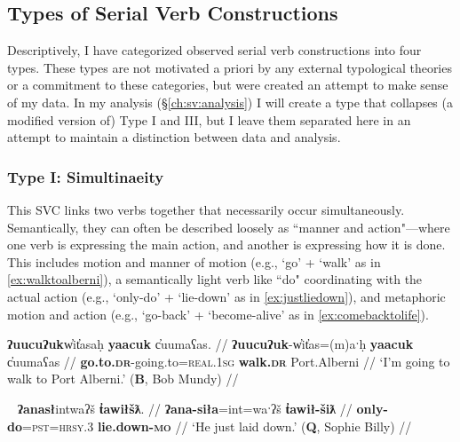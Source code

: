 \subsection{Types of Serial Verb Constructions}

Descriptively, I have categorized observed serial verb constructions into four types. These types are not motivated a priori by any external typological theories or a commitment to these categories, but were created an attempt to make sense of my data. In my analysis (\S\ref{ch:sv:analysis}) I will create a type that collapses (a modified version of) Type I and III, but I leave them separated here in an attempt to maintain a distinction between data and analysis.

\vspace{10pt}

\subsubsection{Type I: Simultinaeity} \label{ch:sv:data:type1}

\vspace{10pt}

This SVC links two verbs together that necessarily occur simultaneously. Semantically, they can often be described loosely as ``manner and action"---where one verb is expressing the main action, and another is expressing how it is done. This includes motion and manner of motion (e.g., `go' + `walk' as in \ref{ex:walktoalberni}), a semantically light verb like ``do" coordinating with the actual action (e.g., `only-do' + `lie-down' as in \ref{ex:justliedown}), and metaphoric motion and action (e.g., `go-back' + `become-alive' as in \ref{ex:comebacktolife}).

\ex \label{ex:walktoalberni}
\begingl
\glpreamble \textbf{ʔuucuʔuk}w̓it̓asaḥ \textbf{yaacuk} c̓uumaʕas. //
\gla \textbf{ʔuucuʔuk}-w̓it̓as=(m)aˑḥ \textbf{yaacuk} c̓uumaʕas //
\glb \textbf{go.to.\textsc{dr}}-going.to=\textsc{real.1sg} \textbf{walk.\textsc{dr}} Port.Alberni //
\glft `I'm going to walk to Port Alberni.' (\textbf{B}, Bob Mundy) //
\endgl
\xe

\ex~ \label{ex:justliedown}
\begingl
\glpreamble \textbf{ʔanasł}intwaʔš \textbf{t̓awiłšƛ}. //
\gla \textbf{ʔana-siła}=int=waˑʔš \textbf{t̓awił-šiƛ} //
\glb \textbf{only-do}=\textsc{pst}=\textsc{hrsy.3} \textbf{lie.down-\textsc{mo}} //
\glft `He just laid down.' (\textbf{Q}, Sophie Billy) //
\endgl
\xe

\begin{comment}
\ex~ \label{ex:goaheadwent}
\begingl
\glpreamble nay̓iiʔak̓aƛin \textbf{kuw̓iła} \textbf{wałaak}. //
\gla nay̓iiʔak=!aƛ=(m)in \textbf{kuw̓iła} \textbf{wałaak} //
\glb immediately=\textsc{now}=\textsc{real.1pl} \textbf{go.ahead} \textbf{go.to.\textsc{dr}} //
\glft `We immediately went ahead and went.' (\textbf{B}, Marjorie Touchie) //
\endgl
\xe
\end{comment}

